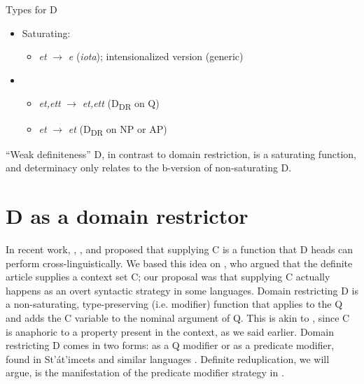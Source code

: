 \documentclass[output=paper,
modfonts
]{langscibook}
\begin{document}
\ea\label{ex:etxeberria:15}
{Types for D}
\begin{itemize}
	\item {Saturating:} 
	\begin{itemize}
		\item \textit{et} $\rightarrow$ \textit{e} (\textit{iota}); intensionalized version (generic)
	\end{itemize} 
	\item {}
	\begin{itemize}
		\item \textit{et,ett} $\rightarrow$ \textit{et,ett} (D\textsubscript{DR} on Q)
		\item \textit{et} $\rightarrow$ \textit{et} (D\textsubscript{DR} on NP or AP)
	\end{itemize}
\end{itemize}
\z

``Weak definiteness'' D, in contrast to domain restriction, is a saturating function, and determinacy \citep{CoppockBeaver2015} only relates to the b-version of non-saturating D. 

\section{D as a domain restrictor} \label{sec:etxeberria:2}\largerpage[2]

In recent work, \citet{Giannakidou2004}, \citet{etxeberria2005}, and \citet{etxeberria-giannakidou2009, etxeberria-giannakidou2014} proposed that supplying C is a function that D heads can perform cross-linguistically. We based this idea on \citet{Westerstahl1984, Westerstaahl1985}, who argued that the definite article supplies a context set C; our proposal was that supplying C actually happens as an overt syntactic strategy in some languages. Domain restricting D is a non-saturating, type-preserving (i.e. modifier) function that applies to the Q and adds the C variable to the nominal argument of Q. This is akin to , since C is anaphoric to a property present in the context, as we said earlier. Domain restricting D comes in two forms: as a Q modifier or as a predicate modifier, found in St'\'at'imcets and similar languages \citep{matthewson2001, gillon2006, gillon2009}. Definite reduplication, we will argue, is the manifestation of the predicate modifier strategy in . 
\end{document}
